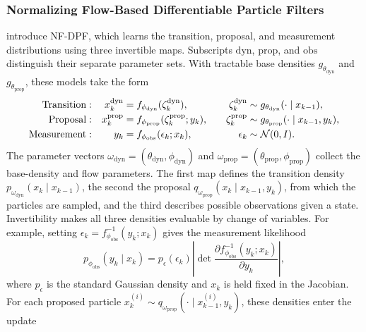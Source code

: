 \subsubsection{Normalizing Flow-Based Differentiable Particle Filters}\label{sec:related-nfdpf}
\citet{chen2025flowparticle} introduce NF-DPF, which learns the transition, proposal, and measurement distributions using three invertible maps. Subscripts $\mathrm{dyn}$, $\mathrm{prop}$, and $\mathrm{obs}$ distinguish their separate parameter sets. With tractable base densities $g_{\theta_{\mathrm{dyn}}}$ and $g_{\theta_{\mathrm{prop}}}$, these models take the form
\begin{equation}\label{eq:nfdpf-components}
\begin{alignedat}{3}
 \mathrm{Transition}&:\quad& x_k^{\mathrm{dyn}}&=f_{\phi_{\mathrm{dyn}}}(\zeta_k^{\mathrm{dyn}}),
 &\qquad\zeta_k^{\mathrm{dyn}}&\sim g_{\theta_{\mathrm{dyn}}}(\cdot\mid x_{k-1}),\\
 \mathrm{Proposal}&:\quad& x_k^{\mathrm{prop}}&=f_{\phi_{\mathrm{prop}}}(\zeta_k^{\mathrm{prop}};y_k),
 &\qquad\zeta_k^{\mathrm{prop}}&\sim g_{\theta_{\mathrm{prop}}}(\cdot\mid x_{k-1},y_k),\\
 \mathrm{Measurement}&:\quad& y_k&=f_{\phi_{\mathrm{obs}}}(\epsilon_k;x_k),
 &\qquad\epsilon_k&\sim\mathcal N(0,I).
\end{alignedat}
\end{equation}
The parameter vectors $\omega_{\mathrm{dyn}}=(\theta_{\mathrm{dyn}},\phi_{\mathrm{dyn}})$ and $\omega_{\mathrm{prop}}=(\theta_{\mathrm{prop}},\phi_{\mathrm{prop}})$ collect the base-density and flow parameters. The first map defines the transition density $p_{\omega_{\mathrm{dyn}}}(x_k\mid x_{k-1})$, the second the proposal $q_{\omega_{\mathrm{prop}}}(x_k\mid x_{k-1},y_k)$, from which the particles are sampled, and the third describes possible observations given a state. Invertibility makes all three densities evaluable by change of variables. For example, setting $\epsilon_k=f_{\phi_{\mathrm{obs}}}^{-1}(y_k;x_k)$ gives the measurement likelihood
\begin{equation}\label{eq:nfdpf-observation-likelihood}
 p_{\phi_{\mathrm{obs}}}(y_k\mid x_k)
 =p_\epsilon(\epsilon_k)\left|\det\frac{\partial f_{\phi_{\mathrm{obs}}}^{-1}(y_k;x_k)}{\partial y_k}\right|,
\end{equation}
where $p_\epsilon$ is the standard Gaussian density and $x_k$ is held fixed in the Jacobian. For each proposed particle $x_k^{(i)}\sim q_{\omega_{\mathrm{prop}}}(\cdot\mid x_{k-1}^{(i)},y_k)$, these densities enter the update
